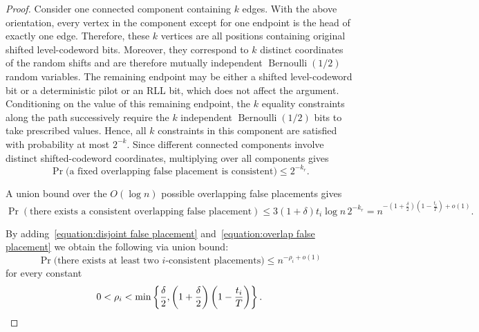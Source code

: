 \documentclass[10pt,a4paper]{amsart}
\begin{document}
\begin{proof}
Consider one connected component containing \(k\) edges. With the above
orientation, every vertex in the component except for one endpoint is
the head of exactly one edge. Therefore, these \(k\) vertices are all
positions containing original shifted level-codeword bits. Moreover,
they correspond to \(k\) distinct coordinates of the random shifts and
are therefore mutually independent
\(\operatorname{Bernoulli}(1/2)\) random variables. The remaining
endpoint may be either a shifted level-codeword bit or a deterministic
pilot or an RLL bit, which does not affect the argument.
Conditioning on the value of this remaining endpoint, the \(k\)
equality constraints along the path successively require the \(k\)
independent \(\operatorname{Bernoulli}(1/2)\) bits to take prescribed
values. Hence, all \(k\) constraints in this component are satisfied
with probability at most \(2^{-k}\). Since different connected
components involve distinct shifted-codeword coordinates, multiplying
over all components gives
\[
\Pr\bigl(
\text{a fixed overlapping false placement is consistent}
\bigr)
\leq
2^{-k_r}.
\]

A union bound over the \(O(\log n)\) possible overlapping false placements gives
\begin{equation}\label{equation:overlap false placement}
    \Pr\left(
\text{there exists a consistent overlapping false placement}
\right)\leq
3(1+\delta)t_i\log n\,2^{-k_{r}}=
n^{-
\left(1+\frac{\delta}{2}\right)
\left(1-\frac{t_i}{T}\right)+o(1)}.
\end{equation}


By adding~\eqref{equation:disjoint false placement} and~\eqref{equation:overlap false placement} we obtain the following via union bound:
\[
\Pr\bigl(\text{there exists at least two $i$-consistent placements})
\leq
n^{-\rho_i+o(1)}
\]
for every constant
\[
0<\rho_i<
\min\left\{
\frac{\delta}{2},
\left(1+\frac{\delta}{2}\right)
\left(1-\frac{t_i}{T}\right)
\right\}.\qedhere
\]
\end{proof}
\end{document}
